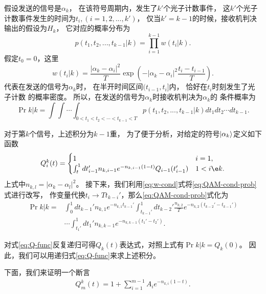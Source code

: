 假设发送的信号是$\alpha_k$，
在该符号周期内，发生了$k'$个光子计数事件，
这$k'$个光子计数事件发生的时间为$t_i,(i=1,2,...,k')$，
仅当$k' = k-1$的时候，接收机判决输出的假设为$H_k$，
它对应的概率分布为
\begin{equation}
p(t_1,t_2,...,t_{k-1}|k) = \prod_{i=1}^{k-1} w(t_i|k).
\end{equation}
假定$t_0=0$，这里
\begin{equation}
w(t_i|k) =  \frac{|\alpha_k - \alpha_i|^2}{T} \exp(-|\alpha_k - \alpha_i|^2 \frac{t_i-t_{i-1}}{T}) .
\label{eq:w-cond}
\end{equation}
代表在发送的信号为$\alpha_k$时，
在半开时间区间$(t_{i-1}, t_i]$内，
恰好在$t_i$时刻发生了光子计数
的概率密度。
所以，在发送的信号为$\alpha_k$时接收机判决为$\alpha_k$的
条件概率为
\begin{equation}
\Pr{k|k} = \int\int\cdots\int_{0<t_1<t_2<\cdots<t_{k-1}<T} p(t_1,t_2,...,t_{k-1}|k) dt_1 dt_2 \cdots dt_{k-1}.
\label{eq:QAM-cond-prob}
\end{equation}

对于第$k$个信号，上述积分为$k-1$重，
为了便于分析，对给定的符号$\ket{\alpha_k}$定义如下函数
\begin{equation}
Q_i^k(t) = \begin{cases}
            1 & i=1, \\
            \int_t^1  dt_{i-1}' n_{k,i-1} e^{-n_{k,i-1}(1-t)} Q_{i-1}(t_{i-1}') & 1 < i \e k.
         \end{cases}
\label{eq:Q-func}
\end{equation}
上式中$n_{k,l} = |\alpha_k - \alpha_l|^2$。
接下来，我们利用\ref{eq:w-cond}式将\ref{eq:QAM-cond-prob}式进行改写，
作变量代换$t_i \rightarrow T t_{k-i}'$，那么\ref{eq:QAM-cond-prob}式化为
\begin{equation}
\begin{split}
\Pr{k|k} = & \int_{0}^1 dt_{k-1}' n_{k,1} e^{-n_{k,1} t_{k-1}'}          \int_{t_{k-1}'}^1 dt_{k-2}'   \frac{n_{k,2}}{T} e^{-n_{k,2} (t_{k-2}'-t_{k-1}')} \\
           & \cdots    \int_{t_1'}^1 dt_1' n_{k,k-1} e^{-n_{k,k-1} (t_1'-t_2')}.
\end{split}
\end{equation}

对式\ref{eq:Q-func}反复递归可得$Q_k(t)$表达式，对照上式有$\Pr{k|k} = Q_k(0)$。
因此，我们可以用递归式\ref{eq:Q-func}来求上述积分。

下面，我们来证明一个断言
\begin{equation}
\begin{split}
Q_m^k(t) = 1 + \sum_{i=1}^{m-1} A_i e^{-n_{k,i}(1-t)}.
\end{split}
\end{equation}


